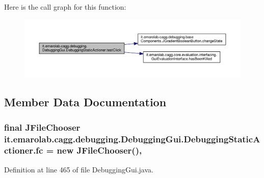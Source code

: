 Here is the call graph for this function\-:
\nopagebreak
\begin{figure}[H]
\begin{center}
\leavevmode
\includegraphics[width=350pt]{classit_1_1emarolab_1_1cagg_1_1debugging_1_1DebuggingGui_1_1DebuggingStaticActioner_a4736589553d273e154d789a1ee42a394_cgraph}
\end{center}
\end{figure}




\subsection{Member Data Documentation}
\hypertarget{classit_1_1emarolab_1_1cagg_1_1debugging_1_1DebuggingGui_1_1DebuggingStaticActioner_a0ae81849fa689680e44d0b3eb4799d1c}{
\subsubsection[{fc}]{\setlength{\rightskip}{0pt plus 5cm}final J\-File\-Chooser it.\-emarolab.\-cagg.\-debugging.\-Debugging\-Gui.\-Debugging\-Static\-Actioner.\-fc = new J\-File\-Chooser()\hspace{0.3cm}{\ttfamily [static]}, {\ttfamily [private]}}}\label{classit_1_1emarolab_1_1cagg_1_1debugging_1_1DebuggingGui_1_1DebuggingStaticActioner_a0ae81849fa689680e44d0b3eb4799d1c}


Definition at line 465 of file Debugging\-Gui.\-java.

